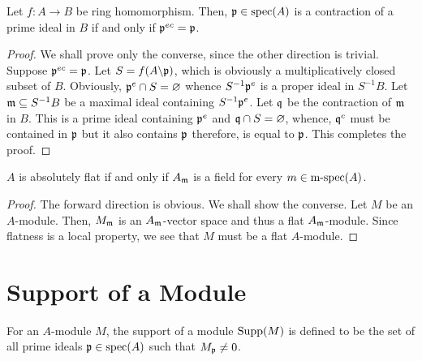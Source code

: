 \begin{theorem}
    Let $f: A\to B$ be ring homomorphism. Then, $\mathfrak p\in\operatorname{spec}(A)$ is a contraction of a prime ideal in $B$ if and only if $\mathfrak p^{ec} = \mathfrak p$.
\end{theorem}
\begin{proof}
    We shall prove only the converse, since the other direction is trivial. Suppose $\mathfrak p^{ec} = \mathfrak p$. Let $S = f(A\backslash\mathfrak p)$, which is obviously a multiplicatively closed subset of $B$. Obviously, $\mathfrak p^e\cap S = \varnothing$ whence $S^{-1}\mathfrak p^e$ is a proper ideal in $S^{-1}B$. Let $\mathfrak m\subseteq S^{-1}B$ be a maximal ideal containing $S^{-1}\mathfrak p^e$. Let $\mathfrak q$ be the contraction of $\mathfrak m$ in $B$. This is a prime ideal containing $\mathfrak p^e$ and $\mathfrak q\cap S = \varnothing$, whence, $\mathfrak q^c$ must be contained in $\mathfrak p$ but it also contains $\mathfrak p$ therefore, is equal to $\mathfrak p$. This completes the proof.
\end{proof}

\hrulefill 

\begin{theorem}
    $A$ is absolutely flat if and only if $A_\mathfrak m$ is a field for every $m\in\operatorname{m-spec}(A)$.
\end{theorem}
\begin{proof}
    The forward direction is obvious. We shall show the converse. Let $M$ be an $A$-module. Then, $M_\mathfrak m$ is an $A_\mathfrak m$-vector space and thus a flat $A_\mathfrak m$-module. Since flatness is a local property, we see that $M$ must be a flat $A$-module.
\end{proof}

\section{Support of a Module}

\begin{definition}
    For an $A$-module $M$, the support of a module $\operatorname{Supp}(M)$ is defined to be the set of all prime ideals $\mathfrak p\in\operatorname{spec}(A)$ such that $M_\mathfrak p\ne 0$.
\end{definition}

